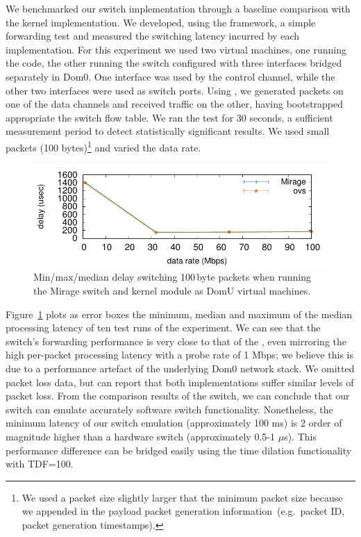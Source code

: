 We benchmarked our \mirage \of switch implementation through a baseline comparison
with the \ovs kernel implementation.  We developed, using
the \oflops framework, a simple forwarding test and measured the switching
latency incurred by each implementation.  For this experiment we used two virtual
machines, one running the \oflops code, the other running the \of switch
configured with three interfaces bridged separately in Dom0. One interface
was used by the \of control channel, while the other two interfaces were used as 
switch ports. Using \oflops, we generated packets on one of the data
channels and received traffic on the other, having bootstrapped appropriate the
switch flow table. We ran the test for 30 seconds, a sufficient measurement
period to detect statistically significant results. We used small packets
(100 bytes)\footnote{We used a packet size slightly larger that the minimum
  packet size because we appended in the payload packet generation
  information~(e.g.~packet ID, packet generation timestamps).} and varied the data
rate.

\begin{figure}
\centering
\includegraphics[width=\columnwidth]{Chapter1/Chapter1Figs/switch-media-delay}
\caption[\of switch data pane evaluation]{\label{fig:switch}Min/max/median delay switching 100\,byte packets
        when running the Mirage switch and \ovs kernel module as DomU
        virtual machines.}
\end{figure}

Figure~\ref{fig:switch} plots as error boxes the minimum, median and maximum of the
median processing latency of ten test runs of the experiment. We can see that
the \mirage switch's forwarding performance is very close to that of the \ovs,
even mirroring the high per-packet processing latency with a probe rate of
1 Mbps; we believe this is due to a performance artefact of the underlying Dom0
network stack. We omitted packet loss data, but can report that both implementations
suffer similar levels of packet loss.  From the comparison results of the
\mirage \of switch, we can conclude that our \of switch can emulate accurately
software switch functionality. Nonetheless, the minimum latency of our switch
emulation (approximately 100 ms) is 2 order of magnitude higher than a
hardware switch (approximately 0.5-1 $\mu$s). This performance difference can
be bridged easily using the time dilation functionality with TDF=100.

